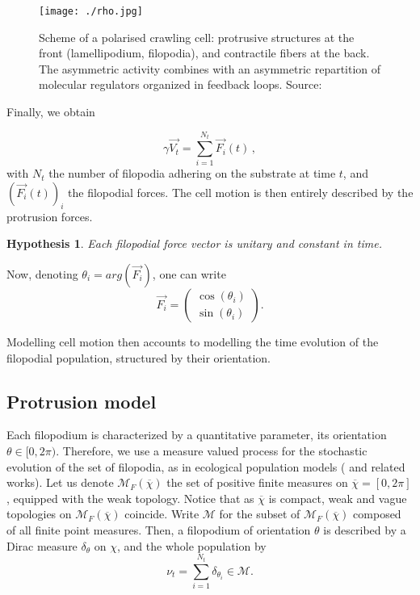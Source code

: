\documentclass[a4paper,11pt]{article}
\newtheorem{hypo}[theo]{Hypothesis}
\begin{document}
\begin{figure}
\centering
\texttt{[image: ./rho.jpg]}
\caption{Scheme of a polarised crawling cell: protrusive structures at the front (lamellipodium, filopodia), and contractile fibers at the back. The asymmetric activity combines with an asymmetric repartition of molecular regulators organized in feedback loops. Source: \citep{mayor2010keeping} }
\end{figure}

Finally, we obtain 

\begin{equation}\label{velocity_model}
\gamma \vec{V_t} = \sum_{i=1}^{N_t} \vec{F_i}(t)\, ,
\end{equation}
with $N_t$ the number of filopodia adhering on the substrate at time $t$, and $(\vec{F_i}(t))_{i}$ the filopodial forces. The cell motion is then entirely described by the protrusion forces.\par 

\begin{hypo}\label{hypo2}
Each filopodial force vector is unitary and constant in time.
\end{hypo}
Now, denoting $\theta_i = arg(\vec{F_i})$, one can write
\begin{displaymath}
\vec{F_i} = \begin{pmatrix}
\cos(\theta_i) \\ \sin(\theta_i)
\end{pmatrix}.
\end{displaymath}

Modelling cell motion then accounts to modelling the time evolution of the filopodial population, structured by their orientation.

\subsection{Protrusion model}
Each filopodium is characterized by a quantitative parameter, its orientation $\theta \in [0,2\pi)$. Therefore, we use a measure valued process for the stochastic evolution of the set of filopodia, as in ecological population models (\cite{fournier_microscopic_2004} and related works).
Let us denote $\mathcal{M}_F(\overline{\chi})$ the set of positive finite measures on $\overline{\chi}=[0,2\pi]$, equipped with the weak topology. Notice that as $\overline{\chi}$ is compact, weak and vague topologies on $\mathcal{M}_F(\overline{\chi})$ coincide. Write 
$\mathcal{M}$ for the subset of $\mathcal{M}_F(\overline{\chi})$ composed of all finite point measures. Then, a filopodium of orientation $\theta$ is described by a Dirac measure $\delta_\theta$ on $\chi$, and the whole population by 
\begin{displaymath}
\nu_t = \sum_{i=1}^{N_t} \delta_{\theta_i} \in \mathcal{M}.
\end{displaymath}
\end{document}
